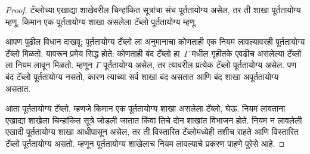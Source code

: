 \begin{proof}
टॅब्लोच्या एखाद्या शाखेवरील
चिन्हांकित सूत्रांचा संच
पूर्ततायोग्य असेल, तर ती शाखा
पूर्ततायोग्य म्हणू. किमान एक
पूर्ततायोग्य शाखा असलेला
टॅब्लो पूर्ततायोग्य म्हणू.

आपण पुढील विधान दाखवू:
पूर्ततायोग्य टॅब्लो ला अनुमानाचा
कोणताही एक नियम लावल्यावरही
पूर्ततायोग्य टॅब्लो मिळतो.
यावरून प्रमेय सिद्ध होते: कोणताही
बंद टॅब्लो हा~$\Gamma$
मधील गृहीतके एवढीच असलेल्या
टॅब्लो ला नियम लावून मिळतो.
म्हणून $\Gamma$ पूर्ततायोग्य
असेल, तर त्यावरील प्रत्येक
टॅब्लो पूर्ततायोग्य असेल.
पण बंद टॅब्लो पूर्ततायोग्य
नसतो, कारण त्याच्या सर्व शाखा
बंद असतात आणि बंद शाखा
अपूर्ततायोग्य असतात.

आता पूर्ततायोग्य टॅब्लो,
म्हणजे किमान एक पूर्ततायोग्य शाखा
असलेला टॅब्लो, घेऊ.
नियम लावताना एखाद्या शाखेला
चिन्हांकित सूत्रे जोडली जातात
किंवा तिचे दोन शाखांत विभाजन
होते. नियम न लावलेली एखादी
पूर्ततायोग्य शाखा आधीपासून
असेल, तर ती विस्तारित
टॅब्लोमध्येही तशीच
राहते आणि विस्तारित टॅब्लो
पूर्ततायोग्य असतो. म्हणून
पूर्ततायोग्य शाखेलाच नियम
लावल्याचे प्रकरण पाहणे पुरेसे आहे.


\end{proof}
